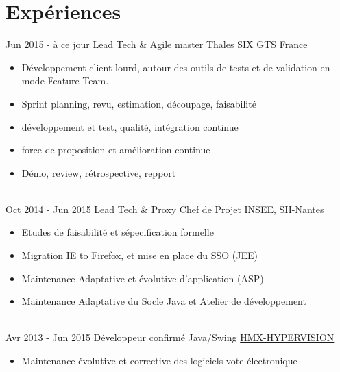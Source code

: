 \documentclass[letterpaper]{twentysecondcv} %
\begin{document}
\makeprofile %


\section{Expériences}

\begin{twenty} %
\twentyitem
    	{Jun 2015 -}
		{à ce jour}
        {Lead Tech \& Agile master}
        {\href{https://www.thalesgroup.com/fr}{Thales SIX GTS France}}
        {}
        {\begin{itemize} 		
      	\item Développement client lourd, autour des outils de tests et de validation en mode Feature Team.
        \item Sprint planning, revu, estimation, découpage, faisabilité
        \item développement et test, qualité, intégration continue
        \item force de proposition et amélioration continue
        \item Démo, review, rétrospective, repport
        \end{itemize}}
        \\
	\twentyitem
    	{Oct 2014 -}
		{Jun 2015}
        {Lead Tech \& Proxy Chef de Projet}
        {\href{https://www.insee.fr/fr/accueil}{INSEE, SII-Nantes}}
        {}
        {
        {\begin{itemize}
		\item Etudes de faisabilité et sépecification formelle
		\item Migration IE to Firefox, et mise en place du SSO (JEE)
		\item Maintenance Adaptative et évolutive d'application (ASP)
		\item Maintenance Adaptative du Socle Java et Atelier de développement
    	\end{itemize}}
        }
     \\
     \twentyitem
   		{Avr 2013 -}
		{Jun 2015}
        {Développeur confirmé Java/Swing}
        {\href{}{HMX-HYPERVISION}}
        {}
        {
        \begin{itemize}
        \item Maintenance évolutive et corrective des logiciels vote électronique

\end{itemize}}
\end{twenty}
\end{document}
